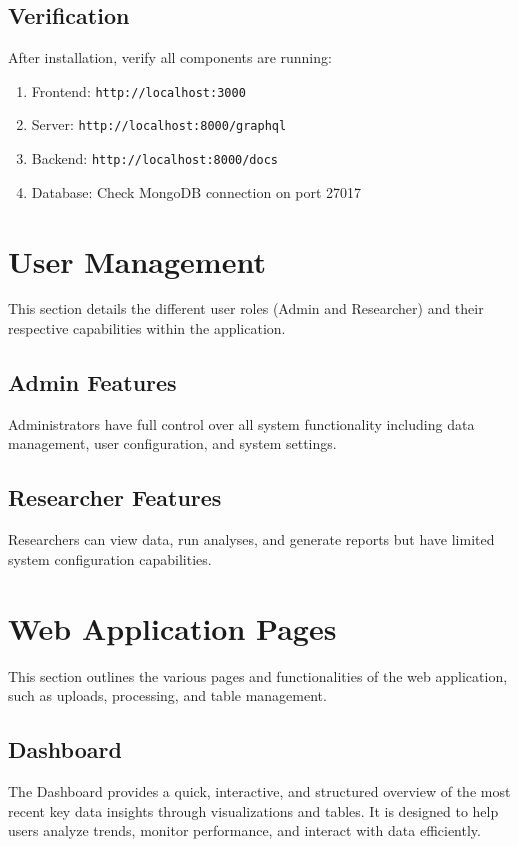 \documentclass[12pt]{article}
\begin{document}
\subsection{Verification}
After installation, verify all components are running:
\begin{enumerate}
    \item Frontend: \texttt{http://localhost:3000}
    \item Server: \texttt{http://localhost:8000/graphql}
    \item Backend: \texttt{http://localhost:8000/docs}
    \item Database: Check MongoDB connection on port 27017
\end{enumerate}

\section{User Management}

This section details the different user roles (Admin and Researcher) and their
respective capabilities within the application.

\subsection{Admin Features}

Administrators have full control over all system functionality including data
management, user configuration, and system settings.


\subsection{Researcher Features}

Researchers can view data, run analyses, and generate reports but have limited
system configuration capabilities.

\section{Web Application Pages}

This section outlines the various pages and functionalities of the web
application, such as uploads, processing, and table management.

\subsection{Dashboard}

The Dashboard provides a quick, interactive, and structured overview of the most
recent key data insights through visualizations and tables. It is designed to
help users analyze trends, monitor performance, and interact with data
efficiently.
\end{document}
